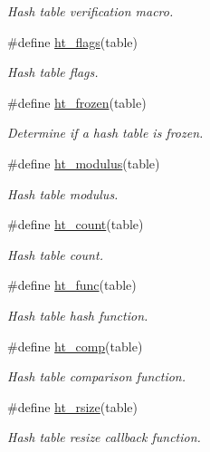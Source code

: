 \begin{CompactItemize}
\begin{CompactList}\small\item\em Hash table verification macro. \item\end{CompactList}\item 
\#define \hyperlink{group__dbprim__hash_ga27}{ht\_\-flags}(table)
\begin{CompactList}\small\item\em Hash table flags. \item\end{CompactList}\item 
\#define \hyperlink{group__dbprim__hash_ga28}{ht\_\-frozen}(table)
\begin{CompactList}\small\item\em Determine if a hash table is frozen. \item\end{CompactList}\item 
\#define \hyperlink{group__dbprim__hash_ga29}{ht\_\-modulus}(table)
\begin{CompactList}\small\item\em Hash table modulus. \item\end{CompactList}\item 
\#define \hyperlink{group__dbprim__hash_ga30}{ht\_\-count}(table)
\begin{CompactList}\small\item\em Hash table count. \item\end{CompactList}\item 
\#define \hyperlink{group__dbprim__hash_ga31}{ht\_\-func}(table)
\begin{CompactList}\small\item\em Hash table hash function. \item\end{CompactList}\item 
\#define \hyperlink{group__dbprim__hash_ga32}{ht\_\-comp}(table)
\begin{CompactList}\small\item\em Hash table comparison function. \item\end{CompactList}\item 
\#define \hyperlink{group__dbprim__hash_ga33}{ht\_\-rsize}(table)
\begin{CompactList}\small\item\em Hash table resize callback function. \item\end{CompactList}\item 

\end{CompactItemize}
